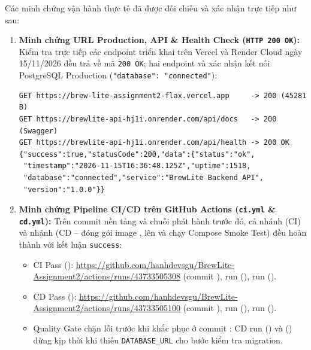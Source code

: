 \documentclass[12pt,a4paper]{report}
\begin{document}
\begin{sloppypar}
Các minh chứng vận hành thực tế đã được đối chiếu và xác nhận trực tiếp như sau:
\begin{enumerate}[leftmargin=*]
\item \textbf{Minh chứng URL Production, API \& Health Check (\texttt{HTTP 200 OK}):} Kiểm tra trực tiếp các endpoint triển khai trên Vercel và Render Cloud ngày 15/11/2026 đều trả về mã \texttt{200 OK}; hai endpoint  và  xác nhận kết nối PostgreSQL Production (\texttt{"database": "connected"}):

\noindent\begin{minipage}{\linewidth}
\begingroup\singlespacing\footnotesize
\begin{verbatim}
GET https://brew-lite-assignment2-flax.vercel.app     -> 200 (45281 B)
GET https://brewlite-api-hj1i.onrender.com/api/docs   -> 200 (Swagger)
GET https://brewlite-api-hj1i.onrender.com/api/health -> 200 OK
{"success":true,"statusCode":200,"data":{"status":"ok",
 "timestamp":"2026-11-15T16:36:48.125Z","uptime":1518,
 "database":"connected","service":"BrewLite Backend API",
 "version":"1.0.0"}}
\end{verbatim}
\endgroup
\end{minipage}\par\vspace{6pt}

\item \textbf{Minh chứng Pipeline CI/CD trên GitHub Actions (\texttt{ci.yml} \& \texttt{cd.yml}):} Trên commit nền tảng  và chuỗi phát hành trước đó, cả nhánh  (CI) và nhánh  (CD -- đóng gói image ,  lên  và chạy Compose Smoke Test) đều hoàn thành với kết luận \texttt{success}:
  \begin{itemize}[nosep]
  \item CI Pass (): \url{https://github.com/hanhdevsgu/BrewLite-Assignment2/actions/runs/43733505308} (commit ), run  (), run  ().
  \item CD Pass (): \url{https://github.com/hanhdevsgu/BrewLite-Assignment2/actions/runs/43733505100} (commit ), run  (), run  ().
  \item Quality Gate chặn lỗi trước khi khắc phục ở commit : CD run  () và  () dừng kịp thời khi thiếu \texttt{DATABASE\_URL} cho bước kiểm tra migration.
  \end{itemize}


\end{enumerate}
\end{sloppypar}
\end{document}
